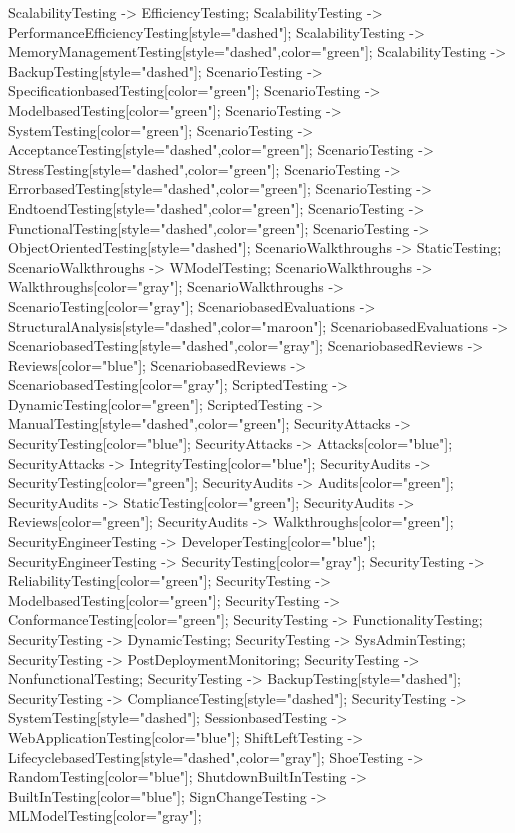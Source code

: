 \documentclass{article}
\begin{document}
{ScalabilityTesting -> EfficiencyTesting;
ScalabilityTesting -> PerformanceEfficiencyTesting[style="dashed"];
ScalabilityTesting -> MemoryManagementTesting[style="dashed",color="green"];
ScalabilityTesting -> BackupTesting[style="dashed"];
ScenarioTesting -> SpecificationbasedTesting[color="green"];
ScenarioTesting -> ModelbasedTesting[color="green"];
ScenarioTesting -> SystemTesting[color="green"];
ScenarioTesting -> AcceptanceTesting[style="dashed",color="green"];
ScenarioTesting -> StressTesting[style="dashed",color="green"];
ScenarioTesting -> ErrorbasedTesting[style="dashed",color="green"];
ScenarioTesting -> EndtoendTesting[style="dashed",color="green"];
ScenarioTesting -> FunctionalTesting[style="dashed",color="green"];
ScenarioTesting -> ObjectOrientedTesting[style="dashed"];
ScenarioWalkthroughs -> StaticTesting;
ScenarioWalkthroughs -> WModelTesting;
ScenarioWalkthroughs -> Walkthroughs[color="gray"];
ScenarioWalkthroughs -> ScenarioTesting[color="gray"];
ScenariobasedEvaluations -> StructuralAnalysis[style="dashed",color="maroon"];
ScenariobasedEvaluations -> ScenariobasedTesting[style="dashed",color="gray"];
ScenariobasedReviews -> Reviews[color="blue"];
ScenariobasedReviews -> ScenariobasedTesting[color="gray"];
ScriptedTesting -> DynamicTesting[color="green"];
ScriptedTesting -> ManualTesting[style="dashed",color="green"];
SecurityAttacks -> SecurityTesting[color="blue"];
SecurityAttacks -> Attacks[color="blue"];
SecurityAttacks -> IntegrityTesting[color="blue"];
SecurityAudits -> SecurityTesting[color="green"];
SecurityAudits -> Audits[color="green"];
SecurityAudits -> StaticTesting[color="green"];
SecurityAudits -> Reviews[color="green"];
SecurityAudits -> Walkthroughs[color="green"];
SecurityEngineerTesting -> DeveloperTesting[color="blue"];
SecurityEngineerTesting -> SecurityTesting[color="gray"];
SecurityTesting -> ReliabilityTesting[color="green"];
SecurityTesting -> ModelbasedTesting[color="green"];
SecurityTesting -> ConformanceTesting[color="green"];
SecurityTesting -> FunctionalityTesting;
SecurityTesting -> DynamicTesting;
SecurityTesting -> SysAdminTesting;
SecurityTesting -> PostDeploymentMonitoring;
SecurityTesting -> NonfunctionalTesting;
SecurityTesting -> BackupTesting[style="dashed"];
SecurityTesting -> ComplianceTesting[style="dashed"];
SecurityTesting -> SystemTesting[style="dashed"];
SessionbasedTesting -> WebApplicationTesting[color="blue"];
ShiftLeftTesting -> LifecyclebasedTesting[style="dashed",color="gray"];
ShoeTesting -> RandomTesting[color="blue"];
ShutdownBuiltInTesting -> BuiltInTesting[color="blue"];
SignChangeTesting -> MLModelTesting[color="gray"];
}
\end{document}

